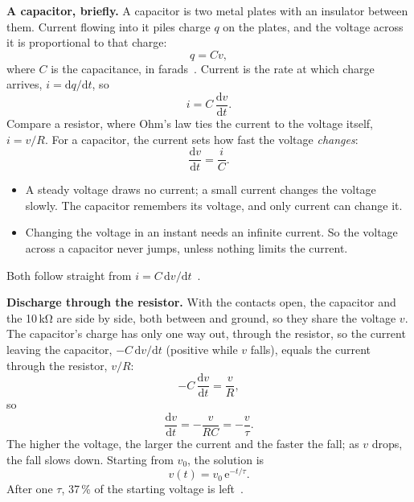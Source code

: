 \documentclass[11pt,a4paper]{article}
\begin{document}
\textbf{A capacitor, briefly.} A capacitor is two metal plates with an insulator between them. Current flowing into it piles charge $q$ on the plates, and the voltage across it is proportional to that charge:
\[ q = C v, \tag*{[C]} \]
where $C$ is the capacitance, in farads~\cite[§1.4.1 \textit{Capacitors}, p.~18]{horowitz}\cite[§6.2 \textit{Capacitors}, p.~216]{sadiku}. Current is the rate at which charge arrives, $i = \mathrm{d}q/\mathrm{d}t$, so~\cite[§1.4.1 \textit{Capacitors}, p.~19]{horowitz}\cite[§6.2 \textit{Capacitors}, p.~218]{sadiku}\cite[§7.1 \textit{The Capacitor}, p.~224]{hayt}
\[ i = C\,\frac{\mathrm{d}v}{\mathrm{d}t}. \tag*{[A]} \]
Compare a resistor, where Ohm’s law ties the current to the voltage itself, $i = v/R$. For a capacitor, the current sets how fast the voltage \emph{changes}:
\[ \frac{\mathrm{d}v}{\mathrm{d}t} = \frac{i}{C}. \tag*{[V/s]} \]
\begin{itemize}
  \item A steady voltage draws no current; a small current changes the voltage slowly. The capacitor remembers its voltage, and only current can change it.
  \item Changing the voltage in an instant needs an infinite current. So the voltage across a capacitor never jumps, unless nothing limits the current.
\end{itemize}
Both follow straight from $i = C\,\mathrm{d}v/\mathrm{d}t$~\cite[§7.1 \textit{The Capacitor}, p.~225]{hayt}.

\textbf{Discharge through the resistor.} With the contacts open, the capacitor and the 10\,kΩ are side by side, both between  and ground, so they share the voltage $v$. The capacitor’s charge has only one way out, through the resistor, so the current leaving the capacitor, $-C\,\mathrm{d}v/\mathrm{d}t$ (positive while $v$ falls), equals the current through the resistor, $v/R$:
\[ -C\,\frac{\mathrm{d}v}{\mathrm{d}t} = \frac{v}{R}, \tag*{[A]} \]
so
\[ \frac{\mathrm{d}v}{\mathrm{d}t} = -\frac{v}{RC} = -\frac{v}{\tau}. \tag*{[V/s]} \]
The higher the voltage, the larger the current and the faster the fall; as $v$ drops, the fall slows down. Starting from $v_0$, the solution is~\cite[§1.4.2 \textit{RC circuits: V and I versus time}, p.~21]{horowitz}\cite[§7.2 \textit{The Source-Free RC Circuit}, p.~255]{sadiku}\cite[§8.1 \textit{The Source-Free RC Circuit}, p.~268]{hayt}
\[ v(t) = v_0\,\mathrm{e}^{-t/\tau}. \tag*{[V]} \]
After one $\tau$, 37\,\% of the starting voltage is left~\cite[§7.2 \textit{The Source-Free RC Circuit}, p.~256]{sadiku}.
\end{document}

